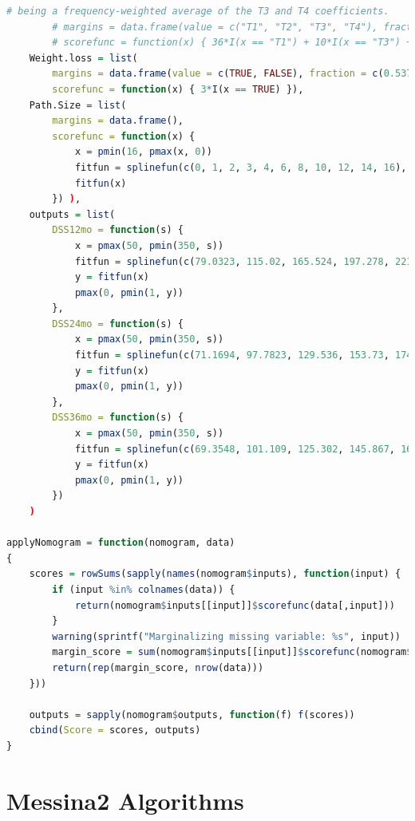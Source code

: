 \begin{lstlisting}[language=R]
		# being a frequency-weighted average of the T3 and T4 coefficients.
		# margins = data.frame(value = c("T1", "T2", "T3", "T4"), fraction = c(0.037, 0.119, 0.828, 1-0.037-0.119-0.828)),
		# scorefunc = function(x) { 36*I(x == "T1") + 10*I(x == "T3") + 63*I(x == "T4") }),
	Weight.loss = list(
		margins = data.frame(value = c(TRUE, FALSE), fraction = c(0.537, 1-0.537)),
		scorefunc = function(x) { 3*I(x == TRUE) }),
	Path.Size = list(
		margins = data.frame(),
		scorefunc = function(x) {
			x = pmin(16, pmax(x, 0))
			fitfun = splinefun(c(0, 1, 2, 3, 4, 6, 8, 10, 12, 14, 16), c(0, 29.74, 59.48, 86.70, 100, 97.29, 90.03, 82.77, 75.51, 68.25, 61.10), method = "natural")
			fitfun(x)
		}) ),
	outputs = list(
		DSS12mo = function(s) {
			x = pmax(50, pmin(350, s))
			fitfun = splinefun(c(79.0323, 115.02, 165.524, 197.278, 221.774, 242.339, 261.089, 279.839, 299.194, 323.992, 337.298), c(0.94, 0.9, 0.8, 0.7, 0.6, 0.5, 0.4, 0.3, 0.2, 0.1, 0.06))
			y = fitfun(x)
			pmax(0, pmin(1, y))
		},
		DSS24mo = function(s) {
			x = pmax(50, pmin(350, s))
			fitfun = splinefun(c(71.1694, 97.7823, 129.536, 153.73, 174.294, 193.347, 211.794, 231.452, 255.645, 303.125), c(0.86, 0.8, 0.7, 0.6, 0.5, 0.4, 0.3, 0.2, 0.1, 0.01))
			y = fitfun(x)
			pmax(0, pmin(1, y))
		},
		DSS36mo = function(s) {
			x = pmax(50, pmin(350, s))
			fitfun = splinefun(c(69.3548, 101.109, 125.302, 145.867, 164.919, 183.367, 202.722, 226.915, 274.093), c(0.8, 0.7, 0.6, 0.5, 0.4, 0.3, 0.2, 0.1, 0.01))
			y = fitfun(x)
			pmax(0, pmin(1, y))
		}) 
	)

applyNomogram = function(nomogram, data)
{
	scores = rowSums(sapply(names(nomogram$inputs), function(input) {
		if (input %in% colnames(data)) {
			return(nomogram$inputs[[input]]$scorefunc(data[,input]))
		}
		warning(sprintf("Marginalizing missing variable: %s", input))
		margin_score = sum(nomogram$inputs[[input]]$scorefunc(nomogram$inputs[[input]]$margins$value) * nomogram$inputs[[input]]$margins$fraction)
		return(rep(margin_score, nrow(data)))
	}))

	outputs = sapply(nomogram$outputs, function(f) f(scores))
	cbind(Score = scores, outputs)
}
\end{lstlisting}





\chapter{Messina2 Algorithms}
\label{app:mess-algos}

